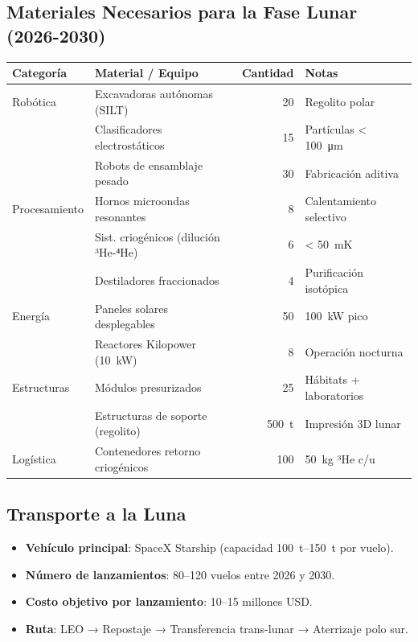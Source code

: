 \documentclass[11pt,a4paper]{article}
\begin{document}
\subsection{Materiales Necesarios para la Fase Lunar (2026-2030)}
\begin{table}[H]
\centering
\begin{tabular}{l l r l}
\toprule
\textbf{Categoría} & \textbf{Material / Equipo} & \textbf{Cantidad} & \textbf{Notas} \\
\midrule
Robótica & Excavadoras autónomas (SILT) & 20 & Regolito polar \\
 & Clasificadores electrostáticos & 15 & Partículas < \SI{100}{\micro\metre} \\
 & Robots de ensamblaje pesado & 30 & Fabricación aditiva \\
Procesamiento & Hornos microondas resonantes & 8 & Calentamiento selectivo \\
 & Sist. criogénicos (dilución ³He-⁴He) & 6 & < \SI{50}{\milli\kelvin} \\
 & Destiladores fraccionados & 4 & Purificación isotópica \\
Energía & Paneles solares desplegables & 50 & \SI{100}{\kilo\watt} pico \\
 & Reactores Kilopower (\SI{10}{\kilo\watt}) & 8 & Operación nocturna \\
Estructuras & Módulos presurizados & 25 & Hábitats + laboratorios \\
 & Estructuras de soporte (regolito) & \SI{500}{\tonne} & Impresión 3D lunar \\
Logística & Contenedores retorno criogénicos & 100 & \SI{50}{\kilo\gram} ³He c/u \\
\bottomrule
\end{tabular}
\end{table}
\subsection{Transporte a la Luna}
\begin{itemize}
\item \textbf{Vehículo principal}: SpaceX Starship (capacidad \SIrange{100}{150}{\tonne} por vuelo).
\item \textbf{Número de lanzamientos}: 80--120 vuelos entre 2026 y 2030.
\item \textbf{Costo objetivo por lanzamiento}: 10--15 millones USD.
\item \textbf{Ruta}: LEO → Repostaje → Transferencia trans-lunar → Aterrizaje polo sur.
\end{itemize}
\end{document}
